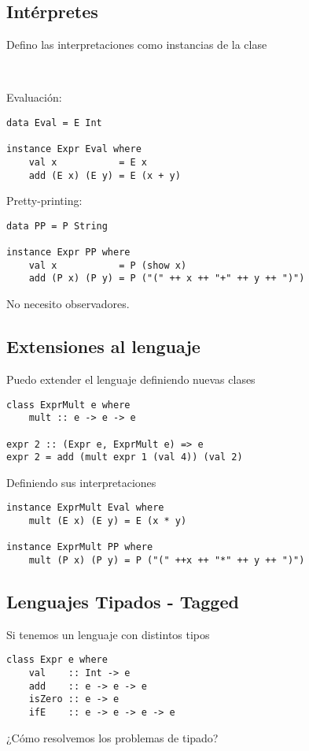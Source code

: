 \documentclass{article}
\newcommand{\imp}[1]{\textcolor{color1}{#1}}
\begin{document}
\subsection{Intérpretes}

\noindent Defino las interpretaciones como \imp{instancias} de la clase

\

Evaluación:
\begin{lstlisting}
data Eval = E Int

instance Expr Eval where
    val x           = E x
    add (E x) (E y) = E (x + y)
\end{lstlisting}

Pretty-printing:
\begin{lstlisting}
data PP = P String

instance Expr PP where
    val x           = P (show x)
    add (P x) (P y) = P ("(" ++ x ++ "+" ++ y ++ ")")
\end{lstlisting}
No necesito \imp{observadores}.

\subsection{Extensiones al lenguaje}

Puedo \imp{extender} el lenguaje definiendo nuevas clases

\begin{lstlisting}
class ExprMult e where
    mult :: e -> e -> e
    
expr 2 :: (Expr e, ExprMult e) => e
expr 2 = add (mult expr 1 (val 4)) (val 2)
\end{lstlisting}


Definiendo sus interpretaciones
\begin{lstlisting}
instance ExprMult Eval where
    mult (E x) (E y) = E (x * y)

instance ExprMult PP where
    mult (P x) (P y) = P ("(" ++x ++ "*" ++ y ++ ")")
\end{lstlisting}

\subsection{Lenguajes Tipados - Tagged}

Si tenemos un lenguaje con distintos \imp{tipos}

\begin{lstlisting}
class Expr e where
    val    :: Int -> e
    add    :: e -> e -> e
    isZero :: e -> e
    ifE    :: e -> e -> e -> e
\end{lstlisting}
¿Cómo resolvemos los problemas de tipado?
\end{document}
